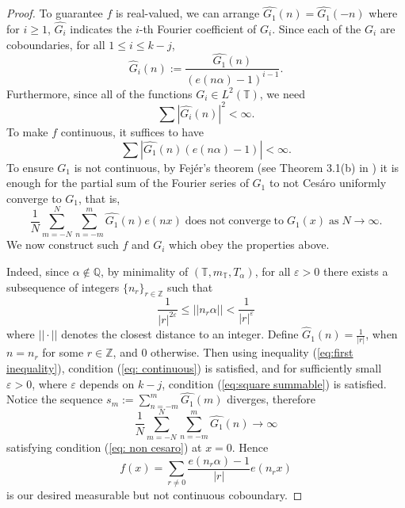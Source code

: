 \documentclass[12pt]{amsart}
\theoremstyle{definition}
\theoremstyle{plain}
\theoremstyle{definition}
\numberwithin{equation}{section}
\begin{document}
\begin{proof}


To guarantee $f$ is real-valued, we can arrange $\widehat{G_1}(n)=\widehat{G_1}(-n)$ where for $i\geq 1$, $\widehat{G_i}$ indicates the $i$-th Fourier coefficient of $G_i$. Since each of the $G_i$ are coboundaries, for all $1 \leq i \leq k-j$,
\begin{equation}\label{eq: all related to first coefficients}
\widehat{G}_i(n):=\frac{\widehat{G_1}(n)}{(e(n\alpha)-1)^{i-1}}.
\end{equation}
Furthermore, since all of the functions $G_i \in L^2(\mathbb{T})$, we need
\begin{equation}\label{eq:square summable}
\sum |\widehat{G_i}(n)|^{2} <\infty.
\end{equation}
To make $f$ continuous, it suffices to have 
\begin{equation}\label{eq: continuous}
    \sum |\widehat{G_1}(n) (e(n\alpha)-1)| <\infty.
\end{equation}
To ensure $G_1$ is not continuous, by Fej\'er's theorem (see Theorem 3.1(b) in \cite{Katznelson}) it is enough for the partial sum of the Fourier series of $G_1$ to not Ces\'aro uniformly converge to $G_1$, that is,
\begin{equation}\label{eq: non cesaro}
    \displaystyle \frac{1}{N} \sum_{m=-N}^{N} \sum_{n=-m}^{m} \widehat{G_1}(n) e(nx)\; \mathrm{does\; not\; converge\; to\;} G_1(x)\; \mathrm{as\;} N \rightarrow \infty.
\end{equation}
We now construct such $f$ and $G_i$ which obey the properties above.


Indeed, since $\alpha \notin \mathbb{Q}$, by minimality of $(\mathbb{T},m_{\mathbb{T}},T_{\alpha})$, for all $\varepsilon>0$ there exists a subsequence of integers $\{n_{r}\}_{r\in \mathbb{Z}}$ such that
\begin{equation}\label{eq:first inequality}
\frac{1}{|r|^{2\varepsilon}} \leq ||n_r \alpha||< \frac{1}{|r|^{\varepsilon}}
\end{equation} where $||\cdot||$ denotes the closest distance to an integer.
Define $\widehat{G}_1(n)=\frac{1}{|r|}$, when $n=n_r$ for some $r \in \mathbb{Z}$, and $0$ otherwise. Then using inequality (\ref{eq:first inequality}), condition (\ref{eq: continuous}) is satisfied, and for sufficiently small $\varepsilon>0$, where $\varepsilon$ depends on $k-j$, condition (\ref{eq:square summable}) is satisfied. %
Notice the sequence $s_m:=\sum_{n=-m}^{m}\widehat{G_1}(m)$ diverges, therefore $$\displaystyle \frac{1}{N} \sum_{m=-N}^{N} \sum_{n=-m}^{m} \widehat{G_1}(n) \rightarrow \infty$$ satisfying condition (\ref{eq: non cesaro}) at $x=0$. Hence $$f(x)=\sum_{r \neq 0} \frac{e(n_r \alpha)-1}{|r|}e(n_r x)$$ is our desired measurable but not continuous coboundary. 




\end{proof}
\end{document}
